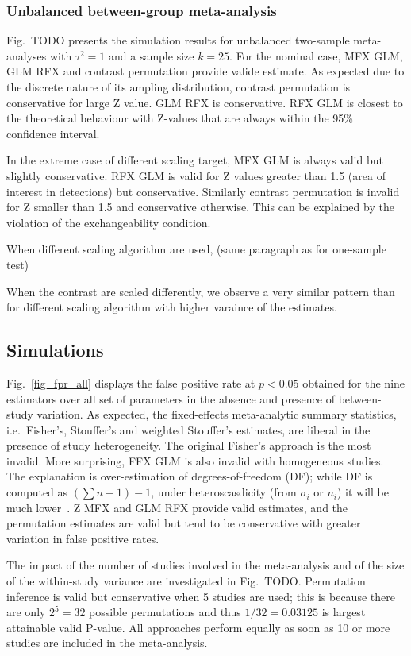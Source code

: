 \documentclass[preprint]{elsarticle}
\newcommand{\nStudies}{k}
\newcommand{\varBetween}{\tau^2}
\newcommand{\sampleSize}[1][i]{n_{#1}}
\begin{document}
\subsubsection{Unbalanced between-group meta-analysis}


Fig.~TODO presents the simulation results for unbalanced two-sample meta-analyses with $\varBetween=1$ and a sample size $\nStudies = 25$. For the nominal case, MFX GLM, GLM RFX and contrast permutation provide valide estimate. As expected due to the discrete nature of its ampling distribution, contrast permutation is conservative for large Z value. GLM RFX is conservative. RFX GLM is closest to the theoretical behaviour with Z-values that are always within the 95\% confidence interval.

In the extreme case of different scaling target, MFX GLM is always valid but slightly conservative. RFX GLM is valid for Z values greater than 1.5 (area of interest in detections) but conservative. Similarly contrast permutation is invalid for Z smaller than 1.5 and conservative otherwise. This can be explained by the violation of the exchangeability condition.

When different scaling algorithm are used, (same paragraph as for one-sample test)

When the contrast are scaled differently, we observe a very similar pattern than for different scaling algorithm with higher varaince of the estimates.


\subsection{Simulations}
Fig.~\ref{fig_fpr_all} displays the false positive rate at $p<0.05$ obtained for the nine estimators over all set of parameters in the absence and presence of between-study variation. As expected, the fixed-effects meta-analytic summary statistics, i.e.\ Fisher's, Stouffer's and weighted Stouffer's estimates, are liberal in the presence of study heterogeneity. The original Fisher's approach is the most invalid. More surprising, FFX GLM is also invalid with homogeneous studies. The explanation is over-estimation of degrees-of-freedom (DF); while DF is computed as $(\sum n-1)-1$, under heteroscasdicity (from $\sigma_i$ or $\sampleSize$) it will be much lower~\cite{Satterthwaite}. Z MFX and GLM RFX provide valid estimates, and the permutation estimates are valid but tend to be conservative with greater variation in false positive rates.

The impact of the number of studies involved in the meta-analysis and of the size of the within-study variance are investigated in Fig.~TODO. Permutation inference is valid but conservative when 5 studies are used; this is because there are only $2^5=32$ possible permutations and thus $1/32=0.03125$ is largest attainable valid P-value. All approaches perform equally as soon as 10 or more studies are included in the meta-analysis. 
\end{document}
